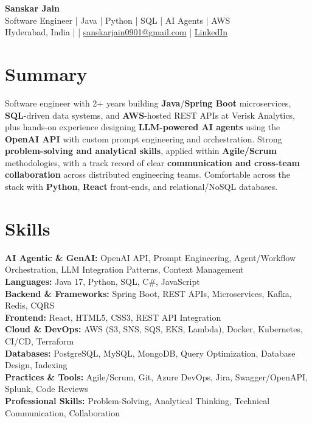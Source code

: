 \documentclass[10pt,letterpaper]{article}
\begin{document}
\begin{center}
    {\Large \textbf{Sanskar Jain}} \\
    Software Engineer \;|\; Java \;|\; Python \;|\; SQL \;|\; AI Agents \;|\; AWS \\
    Hyderabad, India \enspace |  \enspace | \enspace
    \href{mailto:sanskarjain0901@gmail.com}{sanskarjain0901@gmail.com} \enspace | \enspace
    \href{https://www.linkedin.com/in/sanskar-jain0901/}{LinkedIn}
\end{center}

\vspace{2pt}

\section*{Summary}
Software engineer with 2+ years building \textbf{Java}/\textbf{Spring Boot} microservices, \textbf{SQL}-driven data systems, and \textbf{AWS}-hosted REST APIs at Verisk Analytics, plus hands-on experience designing \textbf{LLM-powered AI agents} using the \textbf{OpenAI API} with custom prompt engineering and orchestration. Strong \textbf{problem-solving and analytical skills}, applied within \textbf{Agile/Scrum} methodologies, with a track record of clear \textbf{communication and cross-team collaboration} across distributed engineering teams. Comfortable across the stack with \textbf{Python}, \textbf{React} front-ends, and relational/NoSQL databases.

\section*{Skills}
\textbf{AI Agentic \& GenAI:} OpenAI API, Prompt Engineering, Agent/Workflow Orchestration, LLM Integration Patterns, Context Management \\
\textbf{Languages:} Java 17, Python, SQL, C\#, JavaScript \\
\textbf{Backend \& Frameworks:} Spring Boot, REST APIs, Microservices, Kafka, Redis, CQRS \\
\textbf{Frontend:} React, HTML5, CSS3, REST API Integration \\
\textbf{Cloud \& DevOps:} AWS (S3, SNS, SQS, EKS, Lambda), Docker, Kubernetes, CI/CD, Terraform \\
\textbf{Databases:} PostgreSQL, MySQL, MongoDB, Query Optimization, Database Design, Indexing \\
\textbf{Practices \& Tools:} Agile/Scrum, Git, Azure DevOps, Jira, Swagger/OpenAPI, Splunk, Code Reviews \\
\textbf{Professional Skills:} Problem-Solving, Analytical Thinking, Technical Communication, Collaboration
\end{document}
